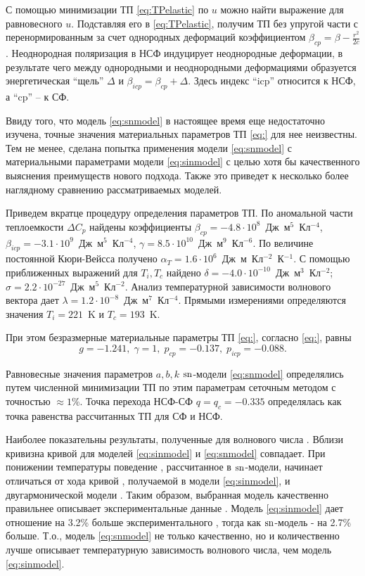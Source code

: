 С помощью минимизации ТП \eqref{eq:TPelastic} по $u$ можно найти выражение для равновесного $u$. 
Подставляя его в \eqref{eq:TPelastic}, получим ТП без упругой части с перенормированным за счет однородных деформаций коэффициентом $\beta_{cp} = \beta - \frac{r^2}{2c}$. 
Неоднородная поляризация в НСФ индуцирует неоднородные деформации, в результате чего между однородными и неоднородными деформациями образуется энергетическая ``щель'' $\Delta$ \cite{Vysochanskii1994} и $\beta_{icp} = \beta_{cp} + \Delta$. 
Здесь индекс ``icp'' относится к НСФ, а ``cp'' -- к СФ.

Ввиду того, что модель \eqref{eq:snmodel} в настоящее время еще недостаточно изучена, точные значения материальных параметров ТП \eqref{eq:} для нее неизвестны. 
Тем не менее, сделана попытка применения модели \eqref{eq:snmodel} с материальными параметрами модели \eqref{eq:sinmodel} с целью хотя бы качественного выяснения преимуществ нового подхода. 
Также это приведет к  несколько более наглядному сравнению рассматриваемых моделей.

Приведем вкратце процедуру определения параметров ТП. По аномальной части теплоемкости $\Delta C_p$ найдены коэффициенты $\beta_{cp} = -4.8\cdot10^8$~Дж~м$^5$~Кл$^{-4}$, $\beta_{icp} = -3.1\cdot10^9$~Дж~м$^5$~Кл$^{-4}$, $\gamma = 8.5\cdot10^{10}$~Дж~м$^9$~Кл$^{-6}$. По величине постоянной Кюри-Вейсса получено $\alpha_T = 1.6\cdot10^6$~Дж~м~Кл$^{-2}$~К$^{-1}$. С помощью приближенных выражений для $T_i, T_c$ найдено $\delta = -4.0\cdot10^{-10}$~Дж~м$^3$~Кл$^{-2}$; $\sigma = 2.2\cdot10^{-27}$~Дж~м$^5$~Кл$^{-2}$. Анализ температурной зависимости волнового вектора дает $\lambda = 1.2\cdot10^{-8}$~Дж~м$^7$~Кл$^{-4}$. Прямыми измерениями определяются значения $T_i=221$~K и $T_c=193$~K.

При этом безразмерные материальные параметры ТП \eqref{eq:}, согласно \eqref{eq:}, равны 
\begin{equation}\label{eq:initparams}
g = -1.241, \; \gamma = 1, \; p_{cp} = -0.137, \; p_{icp} = -0.088.
\end{equation}

Равновесные значения параметров $a,b,k$ $\operatorname{sn}$-модели \eqref{eq:snmodel} определялись путем численной минимизации ТП по этим параметрам сеточным методом с точностью $\approx 1\%$. Точка перехода НСФ-СФ $q = q_c = -0.335$ определялась как точка равенства рассчитанных ТП для СФ и НСФ.

Наиболее показательны результаты, полученные для волнового числа . 
Вблизи  кривизна кривой  для моделей \eqref{eq:sinmodel} и \eqref{eq:snmodel} совпадает. 
При понижении температуры поведение , рассчитанное в $\operatorname{sn}$-модели, начинает отличаться от хода кривой , получаемой в модели \eqref{eq:sinmodel}, и двугармонической модели \cite{Khoma1998}. 
Таким образом, выбранная модель качественно правильнее описывает экспериментальные данные . 
Модель \eqref{eq:sinmodel} дает отношение  на 3.2\% больше экспериментального \cite{Khoma1998}, тогда как $\operatorname{sn}$-модель - на 2.7\% больше. 
Т.о., модель \eqref{eq:snmodel} не только качественно, но и количественно лучше описывает температурную зависимость волнового числа, чем модель \eqref{eq:sinmodel}.

